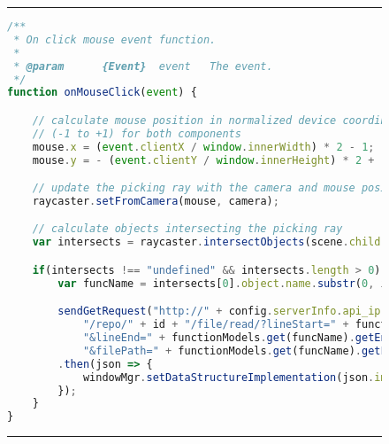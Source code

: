 
\begin{figure}[H]
\noindent\rule{\textwidth}{1pt}
\begin{lstlisting}[language=JavaScript, caption={A snippet of raycast onMouseClick}, label={lst:onClick}]
/**
 * On click mouse event function.
 *
 * @param      {Event}  event   The event.
 */
function onMouseClick(event) {

    // calculate mouse position in normalized device coordinates
    // (-1 to +1) for both components
    mouse.x = (event.clientX / window.innerWidth) * 2 - 1;
    mouse.y = - (event.clientY / window.innerHeight) * 2 + 1;

    // update the picking ray with the camera and mouse position
    raycaster.setFromCamera(mouse, camera);

    // calculate objects intersecting the picking ray
    var intersects = raycaster.intersectObjects(scene.children ,true);

    if(intersects !== "undefined" && intersects.length > 0) {
        var funcName = intersects[0].object.name.substr(0, intersects[0].object.name.indexOf(' |'));

        sendGetRequest("http://" + config.serverInfo.api_ip + ":" + config.serverInfo.api_port +
            "/repo/" + id + "/file/read/?lineStart=" + functionModels.get(funcName).getStartLine() +
            "&lineEnd=" + functionModels.get(funcName).getEndLine() +
            "&filePath=" + functionModels.get(funcName).getFileName())
        .then(json => {
            windowMgr.setDataStructureImplementation(json.implementation);
        });
    }
}
\end{lstlisting}
\noindent\rule{\textwidth}{1pt}
\end{figure}